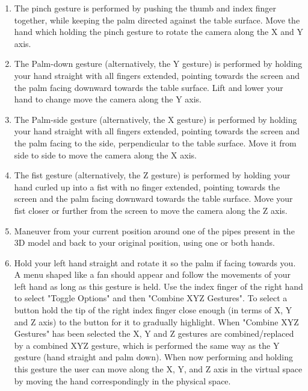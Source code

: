 \begin{enumerate}
    \item The pinch gesture is performed by pushing the thumb and index finger together, while keeping the palm directed against the table surface. 
          Move the hand which holding the pinch gesture to rotate the camera along the X and Y axis.
    
    \item The Palm-down gesture (alternatively, the Y gesture) is performed by holding your hand straight with all fingers extended, pointing towards the screen and the palm facing downward towards the table surface. 
          Lift and lower your hand to change move the camera along the Y axis. 
    
    \item The Palm-side gesture (alternatively, the X gesture) is performed by holding your hand straight with all fingers extended, pointing towards the screen and the palm facing to the side, 
          perpendicular to the table surface. 
          Move it from side to side to move the camera along the X axis.
    
    \item The fist gesture (alternatively, the Z gesture) is performed by holding your hand curled up into a fist with no finger extended, pointing towards the screen and the palm facing downward towards the table surface. 
          Move your fist closer or further from the screen to move the camera along the Z axis. 
    
    \item Maneuver from your current position around one of the pipes present in the 3D model and back to your original position, using one or both hands. 
    
    \item Hold your left hand straight and rotate it so the palm if facing towards you. A menu shaped like a fan should appear and follow the movements of your left hand as long as
          this gesture is held. Use the index finger of the right hand to select "Toggle Options" and then "Combine XYZ Gestures". 
          To select a button hold the tip of the right index finger close enough (in terms of X, Y and Z axis) to the button for it to gradually highlight. 
          When "Combine XYZ Gestures" has been selected the X, Y and Z gestures are combined/replaced by a combined XYZ gesture, which is performed the same way as the Y gesture
          (hand straight and palm down). When now performing and holding this gesture the user can move along the X, Y, and Z axis in the virtual space by moving the hand 
          correspondingly in the physical space.


\end{enumerate}
